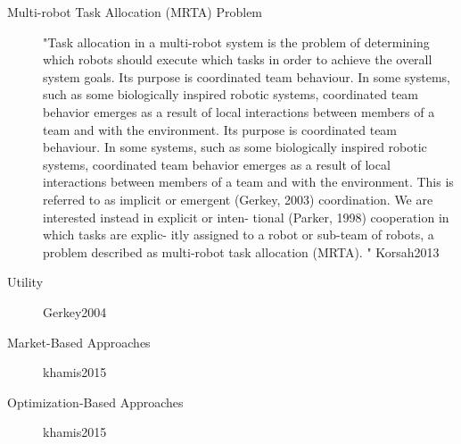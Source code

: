 \documentclass{article}
\begin{document}
\begin{description}
    \item[Multi-robot Task Allocation (MRTA) Problem] "Task allocation in a multi-robot system is the problem
    of determining which robots should execute which tasks
    in order to achieve the overall system goals. Its purpose
    is coordinated team behaviour. In some systems, such as
    some biologically inspired robotic systems, coordinated
    team behavior emerges as a result of local interactions
    between members of a team and with the environment. Its purpose
    is coordinated team behaviour. In some systems, such as
    some biologically inspired robotic systems, coordinated
    team behavior emerges as a result of local interactions
    between members of a team and with the environment.
    This is referred to as implicit or emergent (Gerkey, 2003)
    coordination. We are interested instead in explicit or inten-
    tional (Parker, 1998) cooperation in which tasks are explic-
    itly assigned to a robot or sub-team of robots, a problem
    described as multi-robot task allocation (MRTA).
    "
     Korsah2013
    \item[Utility] Gerkey2004
    \item[Market-Based Approaches] khamis2015
    \item[Optimization-Based Approaches] khamis2015 
\end{description}

\newpage


\end{document}
